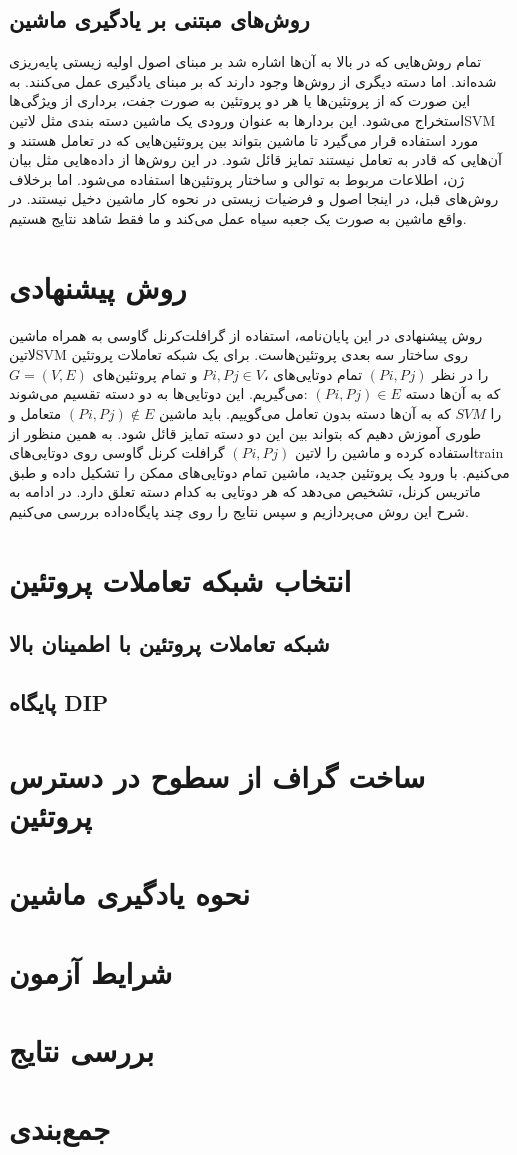 \subsection{روش‌های مبتنی بر یادگیری ماشین}
تمام روش‌هایی که در بالا به آن‌ها اشاره شد بر مبنای اصول اولیه زیستی پایه‌ریزی شده‌اند. اما دسته دیگری از روش‌ها وجود دارند که بر مبنای یادگیری عمل می‌کنند. به این صورت که از پروتئین‌ها یا هر دو پروتئین به صورت جفت، برداری از ویژگی‌ها استخراج می‌شود. این بردارها به عنوان ورودی یک ماشین دسته بندی مثل ‌لاتین{SVM} مورد استفاده قرار می‌گیرد تا ماشین بتواند بین پروتئین‌هایی که در تعامل هستند و آن‌هایی که قادر به تعامل نیستند تمایز قائل شود. در این روش‌ها از داده‌هایی مثل بیان ژن‌، اطلاعات مربوط به توالی و ساختار پروتئین‌ها استفاده می‌شود. اما برخلاف روش‌های قبل، در اینجا اصول و فرضیات زیستی در نحوه کار ماشین دخیل نیستند. در واقع ماشین به صورت یک جعبه سیاه عمل می‌کند و ما فقط شاهد نتایج هستیم.

\section{روش پیشنهادی}
روش پیشنهادی در این پایان‌نامه، استفاده از گرافلت‌کرنل گاوسی به همراه ماشین ‌لاتین{SVM} روی ساختار سه بعدی پروتئین‌هاست. برای یک شبکه تعاملات پروتئین ‪$‬G ‪=‬ ‪(‬V‪,‬E‪)$‬ و تمام پروتئین‌های ‪$‬P‪_‬i‪,‬P‪_‬j\in V‪$‬، تمام دوتایی‌های ‪$‬(P‪_‬i‪,‬P‪_‬j)‪$‬ را در نظر می‌گیریم.‌ این دوتایی‌ها به دو دسته تقسیم می‌شوند: ‪$(‬P‪_‬i‪,‬P‪_‬j‪)‬\in E‪$‬ که به آن‌ها دسته متعامل و ‪$(‬P‪_‬i‪,‬P‪_‬j‪)‬\notin E‪$‬ که به آن‌ها دسته بدون تعامل می‌گوییم. باید ماشین ‪$‬SVM‪$‬ را طوری آموزش دهیم که بتواند بین این دو دسته تمایز قائل شود. به همین منظور از گرافلت کرنل گاوسی روی دوتایی‌های ‪$(‬P‪_‬i‪,‬P‪_‬j‪)$‬ استفاده کرده و ماشین را ‌لاتین{train} می‌کنیم. با ورود یک پروتئین جدید، ماشین تمام دوتایی‌های ممکن را تشکیل داده و طبق ماتریس کرنل، تشخیص می‌دهد که هر دوتایی به کدام دسته تعلق دارد. در ادامه به شرح این روش می‌پردازیم و سپس نتایج را روی چند پایگاه‌داده بررسی می‌کنیم.

\section{انتخاب شبکه تعاملات پروتئین}
\subsection{شبکه تعاملات پروتئین با اطمینان بالا}
\subsection{پایگاه DIP}
\section{ساخت گراف از سطوح در دسترس پروتئین}
\section{نحوه یادگیری ماشین}
\section{شرایط آزمون}
\section{بررسی نتایج}
\section{جمع‌بندی}